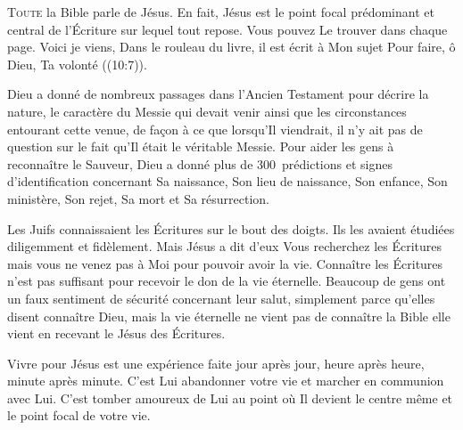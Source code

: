 


\lettrine{T}{oute} la Bible parle de Jésus.
 En fait, Jésus est le point focal prédominant et central de l'Écriture
 sur lequel tout repose. Vous pouvez Le trouver dans chaque page.
 \Og Voici\frcolon{} je viens, \ocadr Dans le rouleau du livre,
 il est écrit à Mon sujet \fcadr{}
 Pour faire, ô Dieu, Ta volonté \Fg{} ((10:7)).

Dieu a donné de nombreux passages dans l'Ancien Testament
 pour décrire la nature, le caractère du Messie qui devait venir
 ainsi que les circonstances entourant cette venue, de fa\c{c}on à ce que
 lorsqu'Il viendrait, il n'y ait pas de question sur le fait qu'Il était
 le véritable Messie. Pour aider les gens à reconnaître le Sauveur,
 Dieu a donné plus de 300~prédictions et signes d'identification
 concernant Sa naissance, Son lieu de naissance, Son enfance,
 Son ministère, Son rejet, Sa mort et Sa résurrection.


Les Juifs connaissaient les Écritures sur le bout des doigts.
 Ils les avaient étudiées diligemment et fidèlement.
 Mais Jésus a dit d'eux\frcolon{} 
 \Og Vous recherchez les Écritures mais vous ne venez pas à Moi
 pour pouvoir avoir la vie. \Fg{}
 Connaître les Écritures n'est pas suffisant pour recevoir
 le don de la vie éternelle. Beaucoup de gens ont un faux sentiment
 de sécurité concernant leur salut, simplement parce qu'elles disent
 connaître Dieu, mais la vie éternelle ne vient pas de connaître la Bible
 \ocadr elle vient en recevant le Jésus des Écritures.

Vivre pour Jésus est une expérience faite jour après jour,
 heure après heure, minute après minute.
 C'est Lui abandonner votre vie et marcher en communion avec Lui.
 C'est tomber amoureux de Lui au point où Il devient le centre même
 et le point focal de votre vie.

\dvrule

